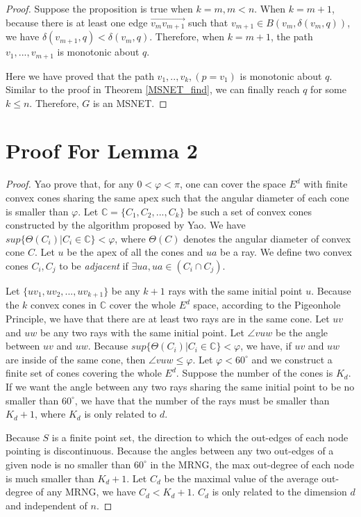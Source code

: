 \documentclass{vldb}
\begin{document}
\begin{appendix}
\begin{proof}
Suppose the proposition is true when $k=m, m < n$. When $k = m+1$, because there is at least one edge $\overset{\longrightarrow}{v_mv_{m+1}}$ such that $v_{m+1} \in B(v_m, \delta(v_m,q))$, we have $\delta(v_{m+1},q) < \delta(v_m,q)$. Therefore, when $k=m+1$, the path $v_1, ... , v_{m+1}$ is monotonic about $q$. 

Here we have proved that the path $v_1, .. , v_k, (p=v_1)$ is monotonic about $q$. Similar to the proof in Theorem \ref{MSNET_find}, we can finally reach $q$ for some $k\le n$.  Therefore, $G$ is an MSNET. 
\end{proof}

\section{Proof For Lemma 2}
\begin{proof}
Yao\cite{yao1982constructing} prove that, for any $0 < \varphi < \pi$, one can cover the space $E^d$ with finite convex cones sharing the same apex such that the angular diameter of each cone is smaller than $\varphi$. Let $\mathbb{C} = \{C_1, C_2, ..., C_k\}$ be such a set of convex cones constructed by the algorithm proposed by Yao. We have $sup\{\Theta(C_i)| C_i \in \mathbb{C}\}< \varphi$, where $\Theta(C)$ denotes the angular diameter of convex cone $C$. Let $u$ be the apex of all the cones and $ua$ be a ray. We define two convex cones $C_i, C_j$ to be \textit{adjacent} if $\exists{ua}, ua \in (C_i \cap C_j)$.

Let $\{uv_1, uv_2, ... ,uv_{k+1} \}$ be any $k+1$ rays with the same initial point $u$. Because the $k$ convex cones in $\mathbb{C}$ cover the whole $E^d$ space, according to the Pigeonhole Principle, we have that there are at least two rays are in the same cone. Let $uv$ and $uw$ be any two rays with the same initial point. Let $\angle{vuw}$ be the angle between $uv$ and $uw$. Because $sup\{\Theta(C_i)| C_i \in \mathbb{C}\} < \varphi$, we have, if $uv$ and $uw$ are inside of the same cone, then $\angle{vuw} \le \varphi$. Let $\varphi < 60^\circ$ and we construct a finite set of cones covering the whole $E^d$. Suppose the number of the cones is $K_d$. If we want the angle between any two rays sharing the same initial point to be no smaller than $60^\circ$, we have that the number of the rays must be smaller than $K_d+1$, where $K_d$ is only related to $d$.


Because $S$ is a finite point set, the direction to which the out-edges of each node pointing is discontinuous. Because the angles between any two out-edges of a given node is no smaller than $60^\circ$ in the MRNG, the max out-degree of each node is much smaller than $K_d+1$. Let $C_d$ be the maximal value of the average out-degree of any MRNG, we have $C_d < K_d+1$. $C_d$ is only related to the dimension $d$ and independent of $n$. 
\end{proof}


\end{appendix}
\end{document}
